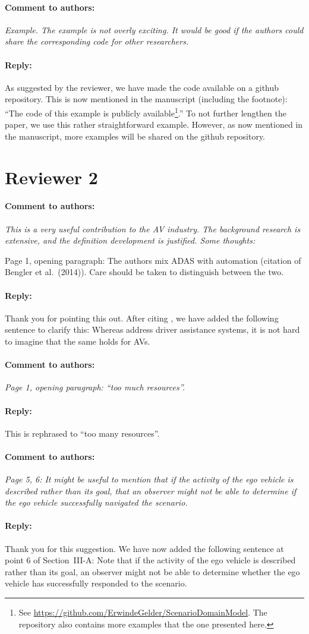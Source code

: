 \documentclass[10pt,final,a4paper,oneside,onecolumn]{article}
\newcommand{\toauthor}{\paragraph*{Comment to authors:} \itshape}
\newcommand{\fromauthor}{\paragraph*{Reply:} \normalfont}
\newcommand{\cstart}{\cbstart\color{red}}
\newcommand{\cend}{\cbend\color{black}}
\begin{document}
\toauthor Example. The example is not overly exciting. It would be good if the authors could share the corresponding code for other researchers.

\fromauthor As suggested by the reviewer, we have made the code available on a github repository. This is now mentioned in the manuscript (including the footnote): ``\cstart The code of this example is publicly available\footnote{\cstart See \url{https://github.com/ErwindeGelder/ScenarioDomainModel}. The repository also contains more examples that the one presented here.\cend}\cend.'' To not further lengthen the paper, we use this rather straightforward example. However, as now mentioned in the manuscript, more examples will be shared on the github repository.



\section*{Reviewer 2}

\toauthor This is a very useful contribution to the AV industry. The background research is extensive, and the definition development is justified. Some thoughts:

Page 1, opening paragraph: The authors mix ADAS with automation (citation of Bengler et al.\ (2014)). Care should be taken to distinguish between the two.

\fromauthor Thank you for pointing this out. After citing \textcite{bengler2014threedecades}, we have added the following sentence to clarify this: \cstart Whereas \textcite{bengler2014threedecades} address driver assistance systems, it is not hard to imagine that the same holds for AVs.\cend



\toauthor Page 1, opening paragraph: ``too much resources''.

\fromauthor This is rephrased to ``\cstart too many resources\cend''.



\toauthor Page 5, 6: It might be useful to mention that if the activity of the ego vehicle is described rather than its goal, that an observer might not be able to determine if the ego vehicle successfully navigated the scenario.

\fromauthor Thank you for this suggestion. We have now added the following sentence at point 6 of Section~III-A: \cstart Note that if the activity of the ego vehicle is described rather than its goal, an observer might not be able to determine whether the ego vehicle has successfully responded to the scenario.\cend
\end{document}
